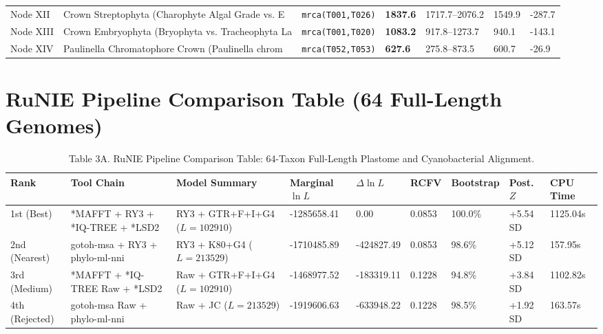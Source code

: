 \documentclass[10pt,letterpaper]{article}
\begin{document}
\begin{longtable}{lllllll}
Node XII & Crown Streptophyta (Charophyte Algal Grade vs. E & \texttt{mrca(T001,T026)} & \textbf{1837.6} & 1717.7--2076.2 & 1549.9 & -287.7 \\
Node XIII & Crown Embryophyta (Bryophyta vs. Tracheophyta La & \texttt{mrca(T001,T020)} & \textbf{1083.2} & 917.8--1273.7 & 940.1 & -143.1 \\
Node XIV & Paulinella Chromatophore Crown (Paulinella chrom & \texttt{mrca(T052,T053)} & \textbf{627.6} & 275.8--873.5 & 600.7 & -26.9 \\
\bottomrule
\end{longtable}

\section{RuNIE Pipeline Comparison Table (64 Full-Length Genomes)}
\begin{table}[htbp]
\centering
\caption{Table 3A. RuNIE Pipeline Comparison Table: 64-Taxon Full-Length Plastome and Cyanobacterial Alignment.}
\footnotesize
\begin{tabular}{lllllllll}
\toprule
Rank & Tool Chain & Model Summary & Marginal $\ln L$ & $\Delta \ln L$ & RCFV & Bootstrap & Post. $Z$ & CPU Time \\
\midrule
1st (Best) & *MAFFT + RY3 + *IQ-TREE + *LSD2 & RY3 + GTR+F+I+G4 ($L=102910$) & -1285658.41 & 0.00 & 0.0853 & 100.0\% & +5.54 SD & 1125.04s \\
2nd (Nearest) & gotoh-msa + RY3 + phylo-ml-nni & RY3 + K80+G4 ($L=213529$) & -1710485.89 & -424827.49 & 0.0853 & 98.6\% & +5.12 SD & 157.95s \\
3rd (Medium) & *MAFFT + *IQ-TREE Raw + *LSD2 & Raw + GTR+F+I+G4 ($L=102910$) & -1468977.52 & -183319.11 & 0.1228 & 94.8\% & +3.84 SD & 1102.82s \\
4th (Rejected) & gotoh-msa Raw + phylo-ml-nni & Raw + JC ($L=213529$) & -1919606.63 & -633948.22 & 0.1228 & 98.5\% & +1.92 SD & 163.57s \\
\bottomrule
\end{tabular}
\end{table}
\end{document}
